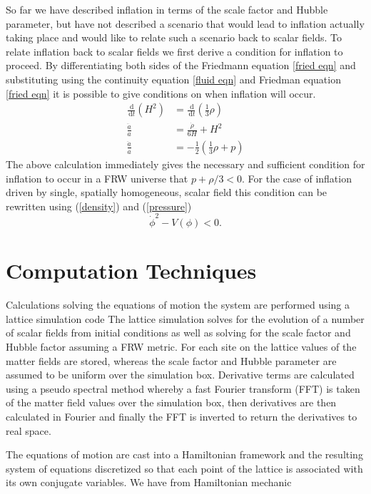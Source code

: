 \documentclass[letterpaper,11pt]{article}
\newcommand{\ud}{\,\mathrm{d}}
\begin{document}
So far we have described inflation in terms of the scale factor and Hubble parameter, but have not described a scenario that would lead to inflation actually taking place and would like to relate such a scenario back to scalar fields. To relate inflation back to scalar fields we first derive a condition for inflation to proceed. By differentiating both sides of the Friedmann equation \ref{fried eqn} and substituting using the continuity equation \ref{fluid eqn} and Friedman equation \ref{fried eqn} it is possible to give conditions on when inflation will occur.%
\begin{align}
\frac{\ud}{\ud t}(H^2)&=\frac{\ud}{\ud t}(\frac{1}{3}\rho)\\
\frac{\ddot{a}}{a}&=\frac{\dot{\rho}}{6H}+H^2\\
\frac{\ddot{a}}{a}&=-\frac{1}{2}(\frac{1}{3}\rho+p)
\end{align}
The above calculation immediately gives the necessary and sufficient condition for inflation to occur in a FRW universe that $p+\rho/3<0$. For the case of inflation driven by single, spatially homogeneous, scalar field this condition can be rewritten using (\ref{density}) and (\ref{pressure})
\begin{equation}
\dot{\phi}^2-V(\phi)<0. \label{inflation condition 3a}
\end{equation}


\section{Computation Techniques}
Calculations solving the equations of motion the system are performed using a lattice simulation code %
The lattice simulation solves for the evolution of a number of scalar fields from initial conditions as well as solving for the scale factor and Hubble factor assuming a FRW metric. For each site on the lattice values of the matter fields are stored, whereas the scale factor and Hubble parameter are assumed to be uniform over the simulation box. Derivative terms are calculated using a pseudo spectral method whereby a fast Fourier transform (FFT) is taken of the matter field values over the simulation box, then derivatives are then calculated in Fourier and finally the FFT is inverted to return the derivatives to real space.

The equations of motion are cast into a Hamiltonian framework and the resulting system of equations discretized so that each point of the lattice is associated with its own conjugate variables. We have from Hamiltonian mechanic
\end{document}
